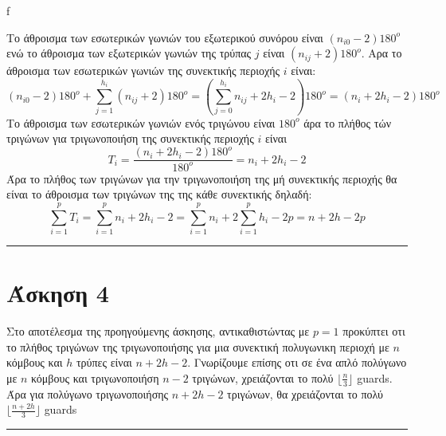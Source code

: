 f\documentclass[12pt]{article}
\begin{document}
Tο άθροισμα των εσωτερικών γωνιών του εξωτερικού συνόρου είναι $(n_{i0} -2 )180^o$ ενώ το άθροισμα των εξωτερικών γωνιών της τρύπας $j$ είναι $(n_{ij} +2 )180^o$. Αρα το άθροισμα των εσωτερικών γωνιών της συνεκτικής περιοχής $i$ είναι:
$$(n_{i0} -2 )180^o + \sum_{j=1}^{h_i}(n_{ij} +2 )180^o = \left(\sum_{j=0}^{h_i}n_{ij} +2 h_i - 2\right)180^o = \left(n_{i} +2 h_i - 2\right)180^o $$
Το άθροισμα των εσωτερικών γωνιών ενός τριγώνου είναι $180^o$ άρα  το πλήθος τών τριγώνων για τριγωνοποιήση της συνεκτικής περιοχής $i$ είναι 
$$T_i = \frac{\left(n_{i} +2 h_i - 2\right)180^o}{180^o} = n_{i} +2 h_i - 2$$
Άρα το πλήθος των τριγώνων για την τριγωνοποιήση της μή συνεκτικής περιοχής θα είναι το άθροισμα των τριγώνων της της κάθε συνεκτικής δηλαδή:
$$\sum_{i=1}^p T_i = \sum_{i=1}^p n_{i} +2 h_i - 2 =\sum_{i=1}^p n_{i}+ 2 \sum_{i=1}^p h_{i} -2p = n+2h - 2p$$
\rule{\textwidth}{.5pt}
\section*{Άσκηση 4}
Στο αποτέλεσμα της προηγούμενης άσκησης, αντικαθιστώντας με $p=1$ προκύπτει οτι το πλήθος τριγώνων της τριγωνοποιήσης για μια συνεκτική πολυγωνικη περιοχή με $n$ κόμβους και $h$ τρύπες είναι 
$n+2h - 2$. Γνωρίζουμε επίσης οτι σε ένα απλό πολύγωνο με $n$ κόμβους και τριγωνοποιήση $n-2$ τριγώνων, χρειάζονται το πολύ $\lfloor \frac{n}{3} \rfloor$ \textlatin{guards}. Άρα για πολύγωνο τριγωνοποιήσης $n+2h - 2$ τριγώνων, θα χρειάζονται
το πολύ $\lfloor \frac{n+2h}{3} \rfloor$ \textlatin{guards}\\
\rule{\textwidth}{.5pt}
\end{document}
